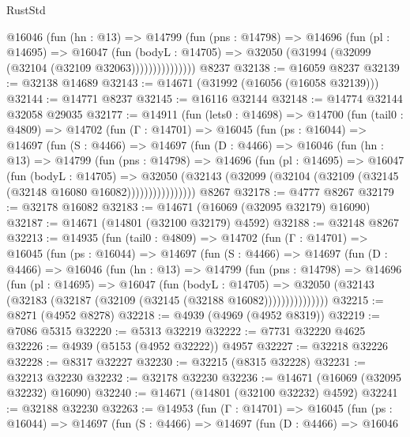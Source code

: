 \begin{lexlean}{RustStd}
\begin{coremodule}
                @16046
                  (fun (hn : @13) =>
                  @14799
                    (fun (pns : @14798) =>
                    @14696
                      (fun (pl : @14695) =>
                      @16047
                        (fun (bodyL : @14705) =>
                        @32050 (@31994 (@32099 (@32104 (@32109 @32063)))))))))))))))
    @8237
@32138 := @16059 @8237
@32139 := @32138 @14689
@32143 := @14671 (@31992 (@16056 (@16058 @32139)))
@32144 := @14771 @8237
@32145 := @16116 @32144
@32148 := @14774 @32144 @32058 @29035
@32177 := @14911
    (fun (lets0 : @14698) =>
    @14700
      (fun (tail0 : @4809) =>
      @14702
        (fun (Γ : @14701) =>
        @16045
          (fun (ps : @16044) =>
          @14697
            (fun (S : @4466) =>
            @14697
              (fun (D : @4466) =>
              @16046
                (fun (hn : @13) =>
                @14799
                  (fun (pns : @14798) =>
                  @14696
                    (fun (pl : @14695) =>
                    @16047
                      (fun (bodyL : @14705) =>
                      @32050
                        (@32143
                          (@32099 (@32104 (@32109 (@32145 (@32148 @16080 @16082))))))))))))))))
    @8267
@32178 := @4777 @8267
@32179 := @32178 @16082
@32183 := @14671 (@16069 (@32095 @32179) @16090)
@32187 := @14671 (@14801 (@32100 @32179) @4592)
@32188 := @32148 @8267
@32213 := @14935
    (fun (tail0 : @4809) =>
    @14702
      (fun (Γ : @14701) =>
      @16045
        (fun (ps : @16044) =>
        @14697
          (fun (S : @4466) =>
          @14697
            (fun (D : @4466) =>
            @16046
              (fun (hn : @13) =>
              @14799
                (fun (pns : @14798) =>
                @14696
                  (fun (pl : @14695) =>
                  @16047
                    (fun (bodyL : @14705) =>
                    @32050 (@32143 (@32183 (@32187 (@32109 (@32145 (@32188 @16082)))))))))))))))
@32215 := @8271 (@4952 @8278)
@32218 := @4939 (@4969 (@4952 @8319))
@32219 := @7086 @5315
@32220 := @5313 @32219
@32222 := @7731 @32220 @4625
@32226 := @4939 (@5153 (@4952 @32222)) @4957
@32227 := @32218 @32226
@32228 := @8317 @32227
@32230 := @32215 (@8315 @32228)
@32231 := @32213 @32230
@32232 := @32178 @32230
@32236 := @14671 (@16069 (@32095 @32232) @16090)
@32240 := @14671 (@14801 (@32100 @32232) @4592)
@32241 := @32188 @32230
@32263 := @14953
    (fun (Γ : @14701) =>
    @16045
      (fun (ps : @16044) =>
      @14697
        (fun (S : @4466) =>
        @14697
          (fun (D : @4466) =>
          @16046

\end{coremodule}
\end{lexlean}

